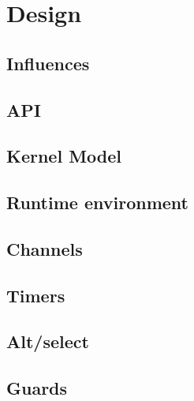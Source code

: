 
\chapter{Design}
\label{ch:design}


\section{Influences}
\section{API}
\section{Kernel Model}
\section{Runtime environment}
\section{Channels}
\section{Timers}
\section{Alt/select}
\section{Guards}

